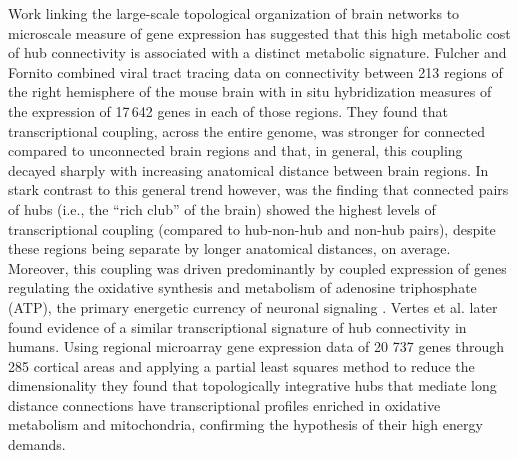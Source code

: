 \documentclass[10pt,letterpaper]{article}
\begin{document}
Work linking the large-scale topological organization of brain networks to microscale measure of gene expression has suggested that this high metabolic cost of hub connectivity is associated with a distinct metabolic signature.
Fulcher and Fornito \cite{Fulcher:2016ck} combined viral tract tracing data on connectivity between 213 regions of the right hemisphere of the mouse brain \cite{Oh2014} with in situ hybridization measures of the expression of 17\,642 genes in each of those regions.
They found that transcriptional coupling, across the entire genome, was stronger for connected compared to unconnected brain regions and that, in general, this coupling decayed sharply with increasing anatomical distance between brain regions.
In stark contrast to this general trend however, was the finding that connected pairs of hubs (i.e., the ``rich club'' of the brain) showed the highest levels of transcriptional coupling (compared to hub-non-hub and non-hub pairs), despite these regions being separate by longer anatomical distances, on average.
Moreover, this coupling was driven predominantly by coupled expression of genes regulating the oxidative synthesis and metabolism of adenosine triphosphate (ATP), the primary energetic currency of neuronal signaling \cite{Lennie:2003ia, Laughlin:2003vu}.
Vertes et al. \cite{Vertes2016a} later found evidence of a similar transcriptional signature of hub connectivity in humans. Using regional microarray gene expression data of 20 737 genes through 285 cortical areas and applying a partial least squares method to reduce the dimensionality they found that topologically integrative hubs that mediate long distance connections have transcriptional profiles enriched in oxidative metabolism and mitochondria, confirming the hypothesis of their high energy demands. 
\end{document}
